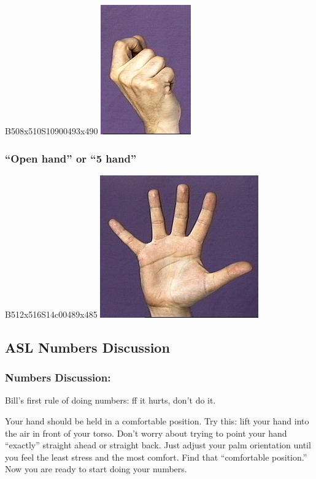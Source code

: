 \documentclass{article}
\begin{document}
B508x510S10900493x490
\includegraphics[scale=0.5]{images/cockedindexfinger.jpg}

\subsubsection{``Open hand'' or ``5 hand''}

B512x516S14c00489x485
\includegraphics[scale=0.5]{images/5.jpg}

\subsection{ASL Numbers Discussion}

\subsubsection{Numbers Discussion:}

Bill's first rule of doing numbers:
ff it hurts, don't do it.

Your hand should be held in a comfortable position.
Try this:
lift your hand into the air in front of your torso.
Don't worry about trying to point your hand ``exactly'' straight ahead or straight back.
Just adjust your palm orientation until you feel the least stress and the most comfort.
Find that ``comfortable position.''
Now you are ready to start doing your numbers.
\end{document}
